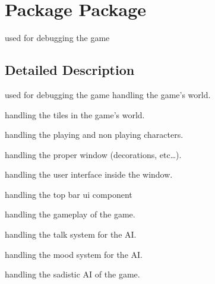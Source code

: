 \hypertarget{namespace_package}{\section{Package Package}
\label{namespace_package}
}


used for debugging the game  




\subsection{Detailed Description}
used for debugging the game handling the game's world.

handling the tiles in the game's world.

handling the playing and non playing characters.

handling the proper window (decorations, etc…).

handling the user interface inside the window.

handling the top bar ui component

handling the gameplay of the game.

handling the talk system for the A\-I.

handling the mood system for the A\-I.

handling the sadistic A\-I of the game. 